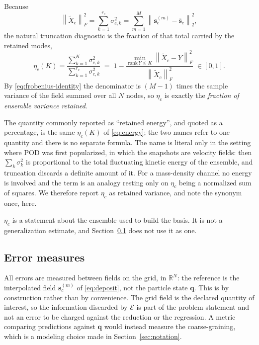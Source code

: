 \documentclass[11pt]{article}
\newcommand{\R}{\mathbb{R}}
\newcommand{\bs}[1]{\boldsymbol{#1}}
\newcommand{\norm}[1]{\left\lVert #1 \right\rVert}
\begin{document}
Because
\begin{equation}
  \norm{\tilde{X}_c}_F^2
  = \sum_{k=1}^{r_c} \sigma_{c,k}^2
  = \sum_{m=1}^{M} \norm{ \bs{s}_c^{(m)} - \bar{\bs{s}}_c }_2^2 ,
  \label{eq:frobenius-identity}
\end{equation}
the natural truncation diagnostic is the fraction of that total carried by the retained
modes,
\begin{equation}
  \eta_c(K) = \frac{\sum_{k=1}^{K} \sigma_{c,k}^2}{\sum_{k=1}^{r_c} \sigma_{c,k}^2}
  \; = \; 1 - \frac{\min_{\mathrm{rank}\,Y \leq K} \norm{\tilde{X}_c - Y}_F^2}
  {\norm{\tilde{X}_c}_F^2} \; \in [0, 1] .
  \label{eq:energy}
\end{equation}
By \eqref{eq:frobenius-identity} the denominator is $(M-1)$ times the sample variance of the
field summed over all $N$ nodes, so $\eta_c$ is exactly the \emph{fraction of ensemble
variance retained}.

The quantity commonly reported as ``retained energy'', and quoted as a percentage, is the
same $\eta_c(K)$ of \eqref{eq:energy}; the two names refer to one quantity and there is no
separate formula. The name is literal only in the setting where POD was first popularized,
in which the snapshots are velocity fields: then $\sum_k \sigma_k^2$ is proportional to the
total fluctuating kinetic energy of the ensemble, and truncation discards a definite amount
of it. For a mass-density channel no energy is involved and the term is an analogy resting
only on $\eta_c$ being a normalized sum of squares. We therefore report $\eta_c$ as retained
variance, and note the synonym once, here.

$\eta_c$ is a statement about the ensemble used to build the basis. It is not a
generalization estimate, and Section~\ref{sec:errors} does not use it as one.

\subsection{Error measures}
\label{sec:errors}

All errors are measured between fields on the grid, in $\R^{N}$: the reference is the
interpolated field $\bs{s}_c^{(m)}$ of \eqref{eq:deposit}, not the particle state
$\bs{q}$. This is by construction rather than by convenience. The grid field is the declared
quantity of interest, so the information discarded by $\mathcal{E}$ is part of the problem
statement and not an error to be charged against the reduction or the regression. A metric
comparing predictions against $\bs{q}$ would instead measure the coarse-graining, which is a
modeling choice made in Section~\ref{sec:notation}.
\end{document}

